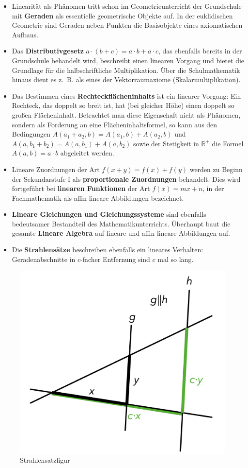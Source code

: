 \documentclass[
]{scrbook}
\providecommand{\tightlist}{%
  \setlength{\itemsep}{0pt}\setlength{\parskip}{0pt}}
\theoremstyle{definition}
\theoremstyle{definition}
\theoremstyle{definition}
\theoremstyle{definition}
\theoremstyle{remark}
\begin{document}
\begin{itemize}
\tightlist
\item
  Linearität als Phänomen tritt schon im Geometrieunterricht der Grundschule mit \textbf{Geraden} als essentielle geometrische Objekte auf. In der euklidischen Geometrie sind Geraden neben Punkten die Basisobjekte eines axiomatischen Aufbaus.
\item
  Das \textbf{Distributivgesetz} \(a\cdot (b+c) = a\cdot b + a\cdot c\), das ebenfalls bereits in der Grundschule behandelt wird, beschreibt einen linearen Vorgang und bietet die Grundlage für die halbschriftliche Multiplikation. Über die Schulmathematik hinaus dient es z.~B. als eines der Vektorraumaxiome (Skalarmultiplikation).
\item
  Das Bestimmen eines \textbf{Rechteckflächeninhalts} ist ein linearer Vorgang: Ein Rechteck, das doppelt so breit ist, hat (bei gleicher Höhe) einen doppelt so großen Flächeninhalt. Betrachtet man diese Eigenschaft nicht als Phänomen, sondern als Forderung an eine Flächeninhaltsformel, so kann aus den Bedingungen \(A(a_1+a_2,b) = A(a_1,b) + A(a_2,b)\) und \(A(a,b_1+b_2) = A(a,b_1)+A(a,b_2)\) sowie der Stetigkeit in \(\mathbb{R}^+\) die Formel \(A(a,b) = a\cdot b\) abgeleitet werden.
\item
  Lineare Zuordnungen der Art \(f(x+y) = f(x)+f(y)\) werden zu Beginn der Sekundarstufe I als \textbf{proportionale Zuordnungen} behandelt. Dies wird fortgeführt bei \textbf{linearen Funktionen} der Art \(f(x) = mx+n\), in der Fachmathematik als affin-lineare Abbildungen bezeichnet.
\item
  \textbf{Lineare Gleichungen und Gleichungssysteme} sind ebenfalls bedeutsamer Bestandteil des Mathematikunterrichts. Überhaupt baut die gesamte \textbf{Lineare Algebra} auf lineare und affin-lineare Abbildungen auf.
\item
  Die \textbf{Strahlensätze} beschreiben ebenfalls ein lineares Verhalten: Geradenabschnitte in \(c\)-facher Entfernung sind \(c\) mal so lang.
\end{itemize}

\begin{figure}

{\centering \includegraphics[width=0.5\linewidth]{pictures/3-Strahlensatz} 

}

\caption{Strahlensatzfigur}\label{fig:Strahlensatz}
\end{figure}
\end{document}
